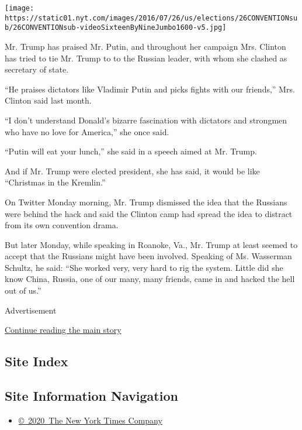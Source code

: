 \texttt{[image: https://static01.nyt.com/images/2016/07/26/us/elections/26CONVENTIONsub/26CONVENTIONsub-videoSixteenByNineJumbo1600-v5.jpg]}

Mr. Trump has praised Mr. Putin, and throughout her campaign Mrs.
Clinton has tried to tie Mr. Trump to to the Russian leader, with whom
she clashed as secretary of state.

``He praises dictators like Vladimir Putin and picks fights with our
friends,'' Mrs. Clinton said last month.

``I don't understand Donald's bizarre fascination with dictators and
strongmen who have no love for America,'' she once said.

``Putin will eat your lunch,'' she said in a speech aimed at Mr. Trump.

And if Mr. Trump were elected president, she has said, it would be like
``Christmas in the Kremlin.''

On Twitter Monday morning, Mr. Trump dismissed the idea that the
Russians were behind the hack and said the Clinton camp had spread the
idea to distract from its own convention drama.

But later Monday, while speaking in Roanoke, Va., Mr. Trump at least
seemed to accept that the Russians might have been involved. Speaking of
Ms. Wasserman Schultz, he said: ``She worked very, very hard to rig the
system. Little did she know China, Russia, one of our many, many
friends, came in and hacked the hell out of us.''

Advertisement

\protect\hyperlink{after-bottom}{Continue reading the main story}

\hypertarget{site-index}{%
\subsection{Site Index}\label{site-index}}

\hypertarget{site-information-navigation}{%
\subsection{Site Information
Navigation}\label{site-information-navigation}}

\begin{itemize}
\tightlist
\item
  \href{https://help.nytimes.com/hc/en-us/articles/115014792127-Copyright-notice}{©~2020~The
  New York Times Company}
\end{itemize}

